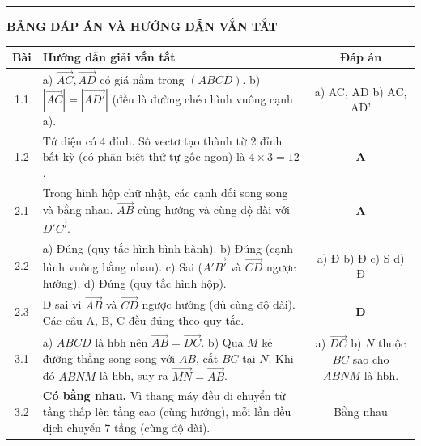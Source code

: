 \documentclass[12pt,a4paper]{article}
\begin{document}
\begin{tcolorbox}[colback=white, colframe=black, title=\textbf{KHỐI 5: BÀI TẬP RÈN LUYỆN TƯƠNG TỰ (Lặp đi lặp lại để khắc sâu)}]
    \vspace{0.5cm}
    \hrule
    \vspace{0.3cm}
    
    \textbf{\textcolor{myred}{BẢNG ĐÁP ÁN VÀ HƯỚNG DẪN VẮN TẮT}}
    
    \begin{tabularx}{\textwidth}{|c|X|c|}
        \hline
        \textbf{Bài} & \textbf{Hướng dẫn giải vắn tắt} & \textbf{Đáp án} \\
        \hline
        1.1 & a) \(\overrightarrow{AC}, \overrightarrow{AD}\) có giá nằm trong \((ABCD)\). \newline b) \(|\overrightarrow{AC}| = |\overrightarrow{AD'}|\) (đều là đường chéo hình vuông cạnh a). & a) AC, AD \newline b) AC, AD' \\
        \hline
        1.2 & Tứ diện có 4 đỉnh. Số vectơ tạo thành từ 2 đỉnh bất kỳ (có phân biệt thứ tự gốc-ngọn) là \(4 \times 3 = 12\). & \textbf{A} \\
        \hline
        2.1 & Trong hình hộp chữ nhật, các cạnh đối song song và bằng nhau. \(\overrightarrow{AB}\) cùng hướng và cùng độ dài với \(\overrightarrow{D'C'}\). & \textbf{A} \\
        \hline
        2.2 & a) Đúng (quy tắc hình bình hành). \newline b) Đúng (cạnh hình vuông bằng nhau). \newline c) Sai (\(\overrightarrow{A'B'}\) và \(\overrightarrow{CD}\) ngược hướng). \newline d) Đúng (quy tắc hình hộp). & a) Đ \newline b) Đ \newline c) S \newline d) Đ \\
        \hline
        2.3 & D sai vì \(\overrightarrow{AB}\) và \(\overrightarrow{CD}\) ngược hướng (dù cùng độ dài). Các câu A, B, C đều đúng theo quy tắc. & \textbf{D} \\
        \hline
        3.1 & a) \(ABCD\) là hbh nên \(\overrightarrow{AB} = \overrightarrow{DC}\). \newline b) Qua \(M\) kẻ đường thẳng song song với \(AB\), cắt \(BC\) tại \(N\). Khi đó \(ABNM\) là hbh, suy ra \(\overrightarrow{MN} = \overrightarrow{AB}\). & a) \(\overrightarrow{DC}\) \newline b) \(N\) thuộc \(BC\) sao cho \(ABNM\) là hbh. \\
        \hline
        3.2 & \textbf{Có bằng nhau.} Vì thang máy đều di chuyển từ tầng thấp lên tầng cao (cùng hướng), mỗi lần đều dịch chuyển 7 tầng (cùng độ dài). & Bằng nhau \\
        \hline
    \end{tabularx}
\end{tcolorbox}
\end{document}
